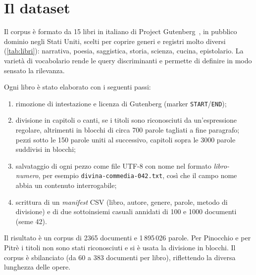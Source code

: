 \documentclass[10pt,a4paper,twocolumn]{article}
\newcommand{\file}[1]{\texttt{#1}}
\begin{document}
\section{Il dataset}
\label{sec:dataset}
Il corpus è formato da 15 libri in italiano di Project Gutenberg~\cite{gutenberg}, in pubblico dominio negli
Stati Uniti, scelti per coprire generi e registri molto diversi (\cref{tab:libri}): narrativa, poesia,
saggistica, storia, scienza, cucina, epistolario. La varietà di vocabolario rende le query discriminanti e
permette di definire in modo sensato la rilevanza.

Ogni libro è stato elaborato con i seguenti passi:
\begin{enumerate}
  \item rimozione di intestazione e licenza di Gutenberg (marker \texttt{START}/\texttt{END});
  \item divisione in capitoli o canti, se i titoli sono riconosciuti da un'espressione regolare, altrimenti in
        blocchi di circa 700 parole tagliati a fine paragrafo; pezzi sotto le 150 parole uniti al successivo,
        capitoli sopra le 3000 parole suddivisi in blocchi;
  \item salvataggio di ogni pezzo come file UTF-8 con nome nel formato \emph{libro-numero}, per esempio
        \file{divina-commedia-042.txt}, così che il campo nome abbia un contenuto interrogabile;
  \item scrittura di un \emph{manifest} CSV (libro, autore, genere, parole, metodo di divisione) e di due
        sottoinsiemi casuali annidati di 100 e 1000 documenti (seme 42).
\end{enumerate}
Il risultato è un corpus di 2365 documenti e 1\,895\,026 parole. Per Pinocchio e per Pitrè i titoli non sono
stati riconosciuti e si è usata la divisione in blocchi. Il corpus è sbilanciato (da 60 a 383 documenti per
libro), riflettendo la diversa lunghezza delle opere.
\end{document}
